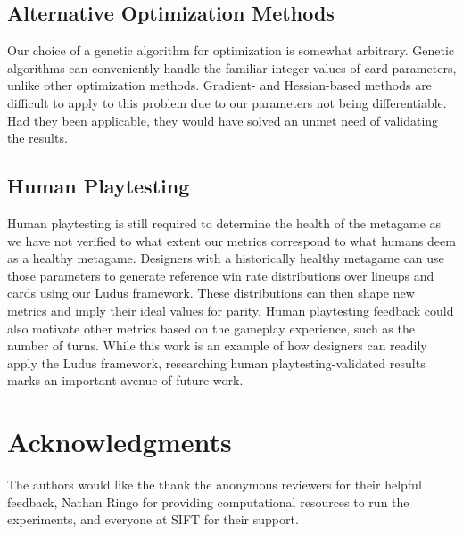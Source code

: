 \documentclass[letterpaper]{article} %
\begin{document}


\subsection{Alternative Optimization Methods}

Our choice of a genetic algorithm for optimization is somewhat arbitrary. Genetic algorithms can conveniently 
handle the familiar integer values of card parameters, unlike other optimization methods. Gradient- and Hessian-based
methods %
are difficult to apply to this problem due to %
our parameters %
not being
differentiable. Had they been applicable, they would have solved an unmet need of %
validating the %
results. %

\subsection{Human Playtesting}

Human playtesting is still required to determine the health of the metagame as we have not verified to what extent our metrics
correspond to what humans deem as a healthy metagame. Designers
with a historically healthy metagame can use those parameters to generate reference win rate distributions 
over lineups and cards using our {\sc Ludus} framework. These distributions can then shape 
new metrics and imply their ideal values for parity. Human playtesting feedback could also motivate other metrics based on the gameplay experience,
such as the number of turns. %
While this work is an example of how designers can readily apply the {\sc Ludus} framework,
researching human playtesting-validated results marks an important avenue of 
future work.

\section*{Acknowledgments}
The authors would like the thank the anonymous reviewers for their helpful feedback, Nathan Ringo for providing computational resources to run the experiments, and everyone at SIFT for their support.


\end{document}
